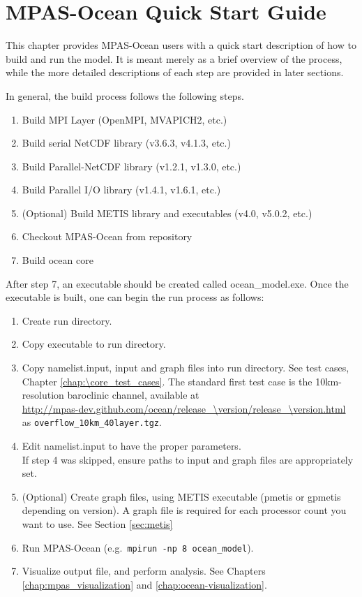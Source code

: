\chapter{MPAS-Ocean Quick Start Guide}
\label{chap:quick_start}

This chapter provides MPAS-Ocean users with a quick start description of how to
build and run the model. It is meant merely as a brief overview of the process,
while the more detailed descriptions of each step are provided in later
sections.

In general, the build process follows the following steps.

\begin{enumerate}
	\item Build MPI Layer (OpenMPI, MVAPICH2, etc.)
	\item Build serial NetCDF library (v3.6.3, v4.1.3, etc.)
	\item Build Parallel-NetCDF library (v1.2.1, v1.3.0, etc.)
	\item Build Parallel I/O library (v1.4.1, v1.6.1, etc.)
	\item (Optional) Build METIS library and executables (v4.0, v5.0.2, etc.)
	\item Checkout MPAS-Ocean from repository
	\item Build ocean core
\end{enumerate}

After step 7, an executable should be created called ocean\_model.exe. Once the executable is built, one can begin the run process as follows:

\begin{enumerate}
	\item Create run directory.
	\item Copy executable to run directory.
	\item Copy namelist.input, input and graph files into run directory.  See test cases, Chapter \ref{chap:\core_test_cases}.  The standard first test case is the 10km-resolution baroclinic channel, available at\\
 \url{http://mpas-dev.github.com/ocean/release_\version/release_\version.html} \\
as {\tt overflow\_10km\_40layer.tgz}.
	\item Edit namelist.input to have the proper parameters. \\
		  If step 4 was skipped, ensure paths to input and graph files are appropriately set.
	\item (Optional) Create graph files, using METIS executable (pmetis or gpmetis depending on version).  A graph file is required for each processor count you want to use.  See Section \ref{sec:metis}
	\item Run MPAS-Ocean (e.g.\ {\tt mpirun -np 8 ocean\_model}).
	\item Visualize output file, and perform analysis.  See Chapters \ref{chap:mpas_visualization} and \ref{chap:ocean-visualization}.
\end{enumerate}
